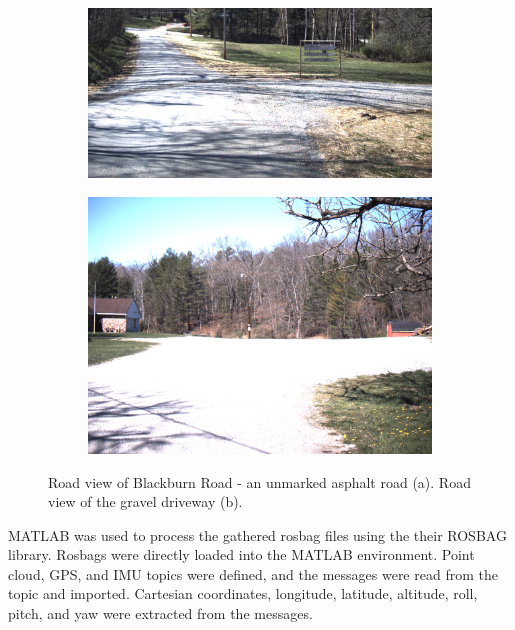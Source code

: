 \documentclass[journal,onecolumn]{IEEEtran}
\begin{document}
	\begin{figure}[H]
		\centering
		\begin{subfigure}{0.45\textwidth}
			\centering
			\includegraphics[width=1.0\linewidth,height=5.0 cm,keepaspectratio]{figures/vlcsnap-2023-04-20-08h48m17s447}
			\caption[Blackburn Road Camera View]{}
			\label{fig:Bean_Cam_View}
		\end{subfigure}
		\begin{subfigure}{0.45\textwidth}
			\centering
			\includegraphics[width=1.0\linewidth,height=5.0 cm,keepaspectratio]{figures/gravel_lot_pic.png}
			\caption[Armig Road Camera View]{}
			\label{fig:Armig_Road_Camera_View}
		\end{subfigure}
		\caption[Blackburn Road \& Gravel Parking Lot]{Road view of Blackburn Road - an unmarked asphalt road (a). Road view of the gravel driveway (b).}
		\label{fig:Combined_Roads}
	\end{figure}

	{MATLAB was used to process the gathered rosbag files using the their ROSBAG library. Rosbags were directly loaded into the MATLAB environment. Point cloud, GPS, and IMU topics were defined, and the messages were read from the topic and imported. Cartesian coordinates, longitude, latitude, altitude, roll, pitch, and yaw were extracted from the messages.}
	
\end{document}
